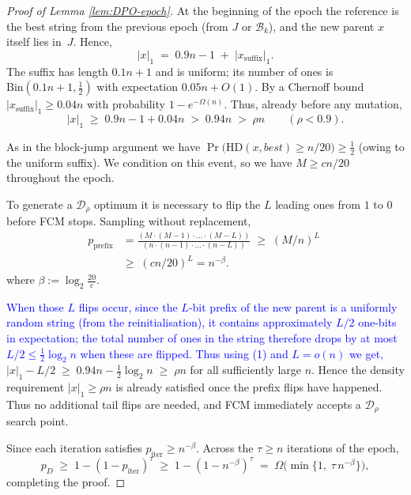 \begin{proof}[Proof of Lemma \ref{lem:DPO-epoch}]
	At the beginning of the epoch the reference is the best string from the previous
	epoch (from $J$ or $\mathcal{B}_k$), and the new parent $x$ itself lies in~$J$.
	Hence,
	\[
	|x|_1\;=\;0.9n-1 \;+\; |x_{\text{suffix}}|_1.
	\]
	The suffix has length $0.1n+1$ and is uniform; its number of ones is
	$\mathrm{Bin}(0.1n+1,\tfrac12)$ with expectation $0.05n+O(1)$.
	By a Chernoff bound
	\(
	|x_{\text{suffix}}|_1\ge 0.04n
	\)
	with probability $1-e^{-\Omega(n)}$.
	Thus, already before any mutation,
	\[
	|x|_1
	\;\ge\;
	0.9n-1 + 0.04n
	\;>\;
	0.94n
	\;>\;
	\rho n
	\qquad(\rho<0.9).
	\tag{1}
	\]
	
	As in the block-jump argument we have
	\(
	\Pr\!\bigl(\mathrm{HD}(x,best)\ge n/20\bigr)\ge\tfrac12
	\)
	(owing to the uniform suffix). We condition on this event, so we have
	 \(M\ge cn/20\) throughout the epoch.
	
	To generate a $\mathcal{D}_\rho$ optimum it is necessary to flip the 
	\(L\) leading ones from $1$ to $0$ before FCM stops.
	Sampling without replacement,
	\begin{align*}
		p_{\text{prefix}}
		&=\frac{(M \cdot (M-1)\cdot  ... \cdot (M-L))}{(n \cdot (n-1)\cdot  ... \cdot (n-L))}
		\;\ge\;
		(M/n)^{L}
		\;\\&\ge\;
		(cn/20)^{L}
		=n^{-\beta}.
	\end{align*}
	where $\beta:=\log_{2}\frac{20}{c}$.
	
	\textcolor{blue}{When those $L$ flips occur,
	since the $L$-bit prefix of the new parent is a uniformly random string
	(from the reinitialisation), it contains approximately $L/2$ one-bits in
	expectation; the total number of ones in the string therefore drops by at
	most $L/2 \le \tfrac12\log_2 n$ when these are flipped.
	Thus using (1) and $L = o(n)$ we get,}
	$|x|_1-L/2\;\ge\;0.94n-\tfrac12\log_2 n
	\;\ge\;\rho n$
	for all sufficiently large $n$.
	Hence the density requirement \(|x|_1\ge\rho n\) is already satisfied
	once the prefix flips have happened. Thus no additional tail flips are needed, and
	FCM immediately accepts a $\mathcal{D}_\rho$ search point.
	
	Since each iteration satisfies \(p_{\text{iter}}\ge n^{-\beta}\).
	Across the \(\tau\ge n\) iterations of the epoch,
	\[
	p_D
	\;\ge\;
	1-(1-p_{\text{iter}})^{\tau}
	\;\ge\;
	1-(1-n^{-\beta})^\tau 
	\;=\;
	\Omega\!\bigl(\min\{1,\;\tau\,n^{-\beta}\}\bigr),
	\]
	completing the proof.
\end{proof}



